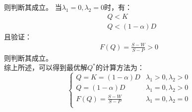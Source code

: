 \documentclass[12pt,a4paper]{article}
\begin{document}
则判断其成立。   
当$\lambda_1 =0,\lambda_2 =0$时，有：
\begin{align*}
    &Q < K \\
    &Q < \left( 1-\alpha \right) D 
\end{align*}
且验证：
\begin{align*}
    F\left( Q \right) =\frac{S-W}{S-P} >0
\end{align*}
则判断其成立。\\
综上所述，可以得到最优解$Q^*$的计算方法为：
\begin{equation}
    \left\{ \begin{matrix}
        Q =K=\left( 1-\alpha \right) D &	\lambda_1 >0,\lambda_2>0	\\
        Q =\left( 1-\alpha \right) D &	\lambda_1 =0,\lambda_2>0	\\
        F\left( Q \right) =\frac{S-W}{S-P}  &	\lambda_1 =0,\lambda_2 =0	\\
    \end{matrix} \right.
\end{equation}



\vspace{10pt} 
\noindent
\end{document}
